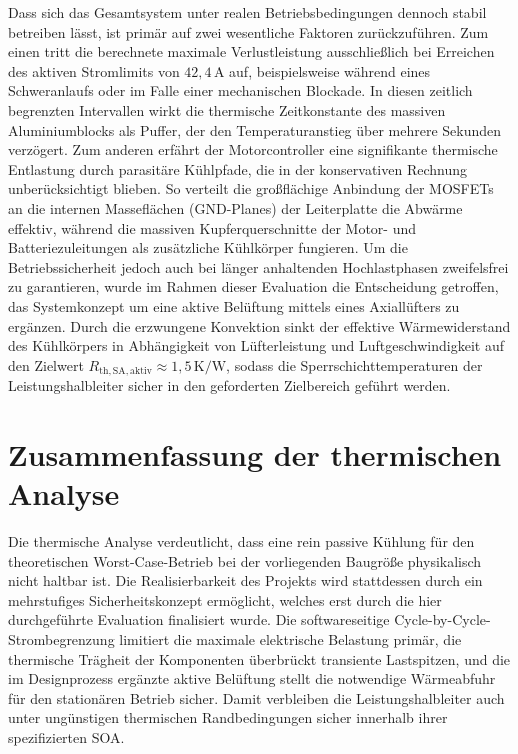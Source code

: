 Dass sich das Gesamtsystem unter realen Betriebsbedingungen dennoch stabil betreiben lässt, ist primär auf zwei wesentliche Faktoren zurückzuführen. Zum einen tritt die berechnete maximale Verlustleistung ausschließlich bei Erreichen des aktiven Stromlimits von $42{,}4\,\mathrm{A}$ auf, beispielsweise während eines Schweranlaufs oder im Falle einer mechanischen Blockade. In diesen zeitlich begrenzten Intervallen wirkt die thermische Zeitkonstante des massiven Aluminiumblocks als Puffer, der den Temperaturanstieg über mehrere Sekunden verzögert. Zum anderen erfährt der Motorcontroller eine signifikante thermische Entlastung durch parasitäre Kühlpfade, die in der konservativen Rechnung unberücksichtigt blieben. So verteilt die großflächige Anbindung der MOSFETs an die internen Masseflächen (GND-Planes) der Leiterplatte die Abwärme effektiv, während die massiven Kupferquerschnitte der Motor- und Batteriezuleitungen als zusätzliche Kühlkörper fungieren. 
Um die Betriebssicherheit jedoch auch bei länger anhaltenden Hochlastphasen zweifelsfrei zu garantieren, wurde im Rahmen dieser Evaluation die Entscheidung getroffen, das Systemkonzept um eine aktive Belüftung mittels eines Axiallüfters zu ergänzen. Durch die erzwungene Konvektion sinkt der effektive Wärmewiderstand des Kühlkörpers in Abhängigkeit von Lüfterleistung und Luftgeschwindigkeit auf den Zielwert $R_{\mathrm{th,SA,aktiv}} \approx 1{,}5\,\mathrm{K/W}$, sodass die Sperrschichttemperaturen der Leistungshalbleiter sicher in den geforderten Zielbereich geführt werden.

\section{Zusammenfassung der thermischen Analyse}
\label{sec:thermik_zusammenfassung}

Die thermische Analyse verdeutlicht, dass eine rein passive Kühlung für den theoretischen Worst-Case-Betrieb bei der vorliegenden Baugröße physikalisch nicht haltbar ist. Die Realisierbarkeit des Projekts wird stattdessen durch ein mehrstufiges Sicherheitskonzept ermöglicht, welches erst durch die hier durchgeführte Evaluation finalisiert wurde. 
Die softwareseitige Cycle-by-Cycle-Strombegrenzung limitiert die maximale elektrische Belastung primär, die thermische Trägheit der Komponenten überbrückt transiente Lastspitzen, und die im Designprozess ergänzte aktive Belüftung stellt die notwendige Wärmeabfuhr für den stationären Betrieb sicher. Damit verbleiben die Leistungshalbleiter auch unter ungünstigen thermischen Randbedingungen sicher innerhalb ihrer spezifizierten SOA.